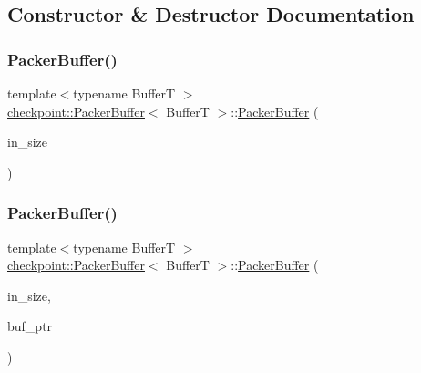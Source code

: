 \subsection{Constructor \& Destructor Documentation}
\mbox{\label{structcheckpoint_1_1_packer_buffer_abd97aedeba81d8570fa047f3efb4220d}} 
\subsubsection{\texorpdfstring{Packer\+Buffer()}{PackerBuffer()}\hspace{0.1cm}{\footnotesize\ttfamily [1/3]}}
{\footnotesize\ttfamily template$<$typename BufferT $>$ \\
\hyperlink{structcheckpoint_1_1_packer_buffer}{checkpoint\+::\+Packer\+Buffer}$<$ BufferT $>$\+::\hyperlink{structcheckpoint_1_1_packer_buffer}{Packer\+Buffer} (\begin{DoxyParamCaption}\item[{\hyperlink{namespacecheckpoint_a083f6674da3f94c2901b18c6d238217c}{Serial\+Size\+Type} const \&}]{in\+\_\+size }\end{DoxyParamCaption})\hspace{0.3cm}{\ttfamily [explicit]}}

\mbox{\label{structcheckpoint_1_1_packer_buffer_a4bdbbf8f84eb065c5c0b02d39a480308}} 
\subsubsection{\texorpdfstring{Packer\+Buffer()}{PackerBuffer()}\hspace{0.1cm}{\footnotesize\ttfamily [2/3]}}
{\footnotesize\ttfamily template$<$typename BufferT $>$ \\
\hyperlink{structcheckpoint_1_1_packer_buffer}{checkpoint\+::\+Packer\+Buffer}$<$ BufferT $>$\+::\hyperlink{structcheckpoint_1_1_packer_buffer}{Packer\+Buffer} (\begin{DoxyParamCaption}\item[{\hyperlink{namespacecheckpoint_a083f6674da3f94c2901b18c6d238217c}{Serial\+Size\+Type} const \&}]{in\+\_\+size,  }\item[{\hyperlink{structcheckpoint_1_1_packer_buffer_a081ec628050e8b173e413271fa070c26}{Buffer\+T\+Ptr\+Type}}]{buf\+\_\+ptr }\end{DoxyParamCaption})}


